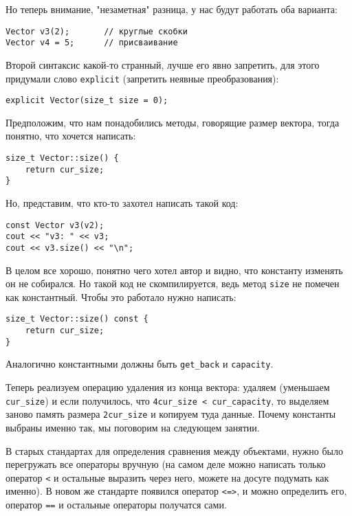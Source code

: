 Но теперь внимание, "незаметная" разница, у нас будут работать оба варианта:
\begin{verbatim}
Vector v3(2);       // круглые скобки
Vector v4 = 5;      // присваивание
\end{verbatim}

Второй синтаксис какой-то странный, лучше его явно запретить, для этого придумали слово \texttt{explicit} (запретить неявные преобразования):
\begin{verbatim}
explicit Vector(size_t size = 0);
\end{verbatim}


Предположим, что нам понадобились методы, говорящие размер вектора, тогда понятно, что хочется написать:

\begin{verbatim}
size_t Vector::size() {
    return cur_size;
}
\end{verbatim}

Но, представим, что кто-то захотел написать такой код:

\begin{verbatim}
const Vector v3(v2);
cout << "v3: " << v3;
cout << v3.size() << "\n";
\end{verbatim}

В целом все хорошо, понятно чего хотел автор и видно, что константу изменять он не собирался. Но такой код не скомпилируется, ведь метод \texttt{size} не помечен как константный. Чтобы это работало нужно написать:
\begin{verbatim}
size_t Vector::size() const {
    return cur_size;
}
\end{verbatim}

Аналогично константными должны быть \texttt{get_back} и \texttt{capacity}.

Теперь реализуем операцию удаления из конца вектора: удаляем (уменьшаем \texttt{cur_size}) и если получилось, что \texttt{4cur_size < cur_capacity}, то выделяем заново память размера \texttt{2cur_size} и копируем туда данные. Почему константы выбраны именно так, мы поговорим на следующем занятии.


В старых стандартах для определения сравнения между объектами, нужно было перегружать все операторы вручную (на самом деле можно написать только оператор \texttt{<} и остальные выразить через него, можете на досуге подумать как именно). В новом же стандарте появился оператор \texttt{<=>}, и можно определить его, оператор \texttt{==} и остальные операторы получатся сами.

